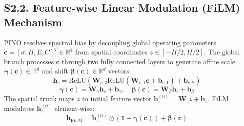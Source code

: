 \documentclass[3p,preprint,12pt,numbers,square,sort&compress]{elsarticle}
\begin{document}
\subsection{S2.2. Feature-wise Linear Modulation (FiLM) Mechanism}
PINO resolves spectral bias by decoupling global operating parameters $\mathbf{c} = [\sigma, H, E, C]^T \in \mathbb{R}^4$ from spatial coordinates $z \in [-H/2, H/2]$. The global branch processes $\mathbf{c}$ through two fully connected layers to generate affine scale $\boldsymbol{\gamma}(\mathbf{c}) \in \mathbb{R}^d$ and shift $\boldsymbol{\beta}(\mathbf{c}) \in \mathbb{R}^d$ vectors:
\begin{equation}
    \mathbf{h}_c = \text{ReLU}\left(\mathbf{W}_{c,2} \text{ReLU}\left(\mathbf{W}_{c,1}\mathbf{c} + \mathbf{b}_{c,1}\right) + \mathbf{b}_{c,2}\right)
    \tag{S7}
\end{equation}
\begin{equation}
    \boldsymbol{\gamma}(\mathbf{c}) = \mathbf{W}_{\gamma} \mathbf{h}_c + \mathbf{b}_{\gamma}, \quad \boldsymbol{\beta}(\mathbf{c}) = \mathbf{W}_{\beta} \mathbf{h}_c + \mathbf{b}_{\beta}
    \tag{S8}
\end{equation}
The spatial trunk maps $z$ to initial feature vector $\mathbf{h}_z^{(0)} = \mathbf{W}_z z + \mathbf{b}_z$. FiLM modulates $\mathbf{h}_z^{(0)}$ element-wise:
\begin{equation}
    \mathbf{h}_{\text{FiLM}} = \mathbf{h}_z^{(0)} \odot \left( \mathbf{1} + \boldsymbol{\gamma}(\mathbf{c}) \right) + \boldsymbol{\beta}(\mathbf{c})
    \tag{S9}
\end{equation}

\begin{table}[H]
\centering
\caption{Hyperparameter configurations for all 6 surrogate model architectures.}
\label{tab:hyperparams}
\end{table}
\end{document}
